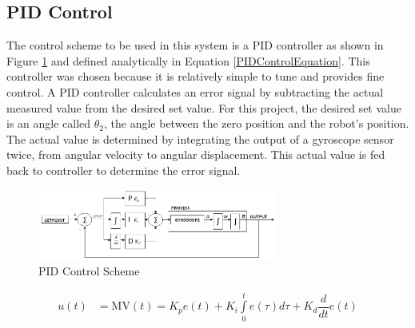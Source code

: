 \documentclass[11pt]{report}
\begin{document}
\begin{spacing}{1.5}
\subsection*{PID Control}

The control scheme to be used in this system is a PID controller as shown in Figure \ref{PIDControlScheme} and defined analytically in Equation \ref{PIDControlEquation}.  This controller was chosen because it is relatively simple to tune and provides fine control.  A PID controller calculates an error signal by subtracting the actual measured value from the desired set value.  For this project, the desired set value is an angle called $\theta_2$, the angle between the zero position and the robot’s position.  The actual value is determined by integrating the output of a gyroscope sensor twice, from angular velocity to angular displacement.  This actual value is fed back to controller to determine the error signal.

\begin{figure}[H]
    \centering
    \includegraphics[width=0.7\textwidth]{PIDControlScheme}
    \caption{PID Control Scheme}
    \label{PIDControlScheme}
\end{figure}

\begin{align}
    u(t) &= \text{MV}(t) = K_p e(t) + K_i \int\limits_0^t e(\tau) d\tau + K_d \dfrac{d}{dt} e(t) \label{PIDControlEquation}
\end{align}


\end{spacing}
\end{document}
